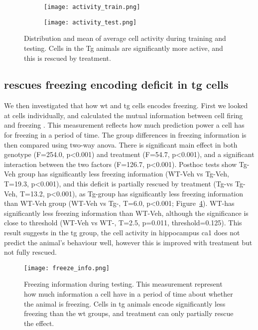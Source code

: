 \begin{figure}[h]
    \begin{subfigure}[h]{\textwidth}
        \texttt{[image: activity\_train.png]}
        \caption{\label{f.ad.acttrain}}
    \end{subfigure}
    \begin{subfigure}[h]{\textwidth}
        \texttt{[image: activity\_test.png]}
        \caption{\label{f.ad.acttest}}
    \end{subfigure}
    \caption{Distribution and mean of average cell activity during  training and  testing. Cells in the Tg animals are significantly more active, and this is rescued by \tglu treatment. \label{f.ad.activity}}
\end{figure}

\subsection{\tglu rescues freezing encoding deficit in \gls{tg} cells}

We then investigated that how \gls{wt} and \gls{tg} cells encodes freezing. First we looked at cells individually, and calculated the mutual information between cell firing and freezing \citep{ross14, victor02}. This measurement reflects how much prediction power a cell has for freezing in a period of time. The group differences in freezing information is then compared using two-way \gls{anova}. There is significant main effect in both genotype (F=254.0, p<0.001) and treatment (F=54.7, p<0.001), and a significant interaction between the two factors (F=126.7, p<0.001). Posthoc tests show Tg-Veh group has significantly less freezing information (WT-Veh vs Tg-Veh, T=19.3, p<0.001), and this deficit is partially rescued by \tglu treatment (Tg-\glu vs Tg-Veh, T=13.2, p<0.001), as Tg-\glu group has significantly less freezing information than WT-Veh group (WT-Veh vs Tg-\glu, T=6.0, p<0.001; Figure~\ref{f.ad.freeze_info}). WT-\glu has significantly less freezing information than WT-Veh, although the significance is close to threshold (WT-Veh vs WT-\glu, T=2.5, p=0.011, threshold=0.125). This result suggests in the \gls{tg} group, the cell activity in hippocampus \gls{ca1} does not predict the animal's behaviour well, however this is improved with \tglu treatment but not fully rescued. 
\begin{figure}[h]
    \texttt{[image: freeze\_info.png]}
    \caption{Freezing information during testing. This measurement represent how much information a cell have in a period of time about whether the animal is freezing. Cells in \gls{tg} animals encode significantly less freezing than the \gls{wt} groups, and \tglu treatment can only partially rescue the effect. \label{f.ad.freeze_info}}
\end{figure}
    

